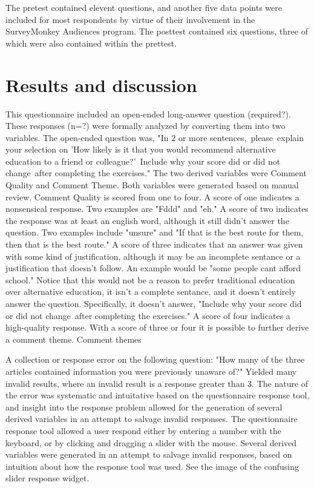 \documentclass[review]{elsarticle}
\begin{document}
    
    The pretest contained elevent questions, and another five data points were included for most respondents by virtue of their involvement in the SurveyMonkey Audiences program.
    The posttest contained six questions, three of which were also contained within the prettest.


    \section{Results and discussion}

    This questionnaire included an open-ended long-answer question (required?). These responses (n=?) were formally analyzed by converting them into two variables.
    The open-ended question was, "In 2 or more sentences, please explain your selection on 'How likely is it that you would recommend alternative education to a friend or colleague?' Include why your score did or did not change after completing the exercises."
    The two derived variables were Comment Quality and Comment Theme. Both variables were generated based on manual review.
    Comment Quality is scored from one to four. A score of one indicates a nonsensical response. Two examples are "Fddd" and "eh."
    A score of two indicates the response was at least an english word, although it still didn't answer the question. Two examples include "unsure" and "If that is the best route for them, then that is the best route."
    A score of three indicates that an answer was given with some kind of justification, although it may be an incomplete sentance or a justification that doesn't follow.
    An example would be "some people cant afford school." Notice that this would not be a reason to prefer traditional education over alternative education,
    it isn't a complete sentance, and it doesn't entirely answer the question.
    Specifically, it doesn't answer, "Include why your score did or did not change after completing the exercises."
    A score of four indicates a high-quality response.
    With a score of three or four it is possible to further derive a comment theme. Comment themes 

    A collection or response error on the following question:
    "How many of the three articles contained information you were previously unaware of?"
    Yielded many invalid results, where an invalid result is a response greater than 3.
    The nature of the error was systematic and intuitative based on the questionnaire response tool,
    and insight into the response problem allowed for the generation of several derived variables in an attempt to salvage invalid responses.
    The questionnaire response tool allowed a user respond either by entering a number with the keyboard, or by clicking and dragging a slider with the mouse.
    Several derived variables were generated in an attempt to salvage invalid responses, based on intuition about how the response tool was used.
    See the image of the confusing slider response widget.
\end{document}
